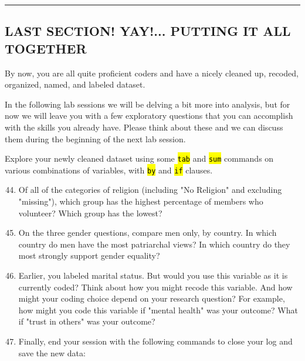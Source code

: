 \documentclass{tufte-handout}
\begin{document}
\bigskip
\hrule
\bigskip

\subsection{LAST SECTION! YAY!... PUTTING IT ALL TOGETHER}

By now, you are all quite proficient coders and have a nicely cleaned up, recoded, organized, named, and labeled dataset.

In the following lab sessions we will be delving a bit more into analysis, but for now we will leave you with a few exploratory questions that you can accomplish with the skills you already have. Please think about these and we can discuss them during the beginning of the next lab session.

Explore your newly cleaned dataset using some {\tt \hl{tab}} and {\tt \hl{sum}} commands on various combinations of variables, with {\tt \hl{by}} and {\tt \hl{if}} clauses.

\begin{enumerate}[leftmargin=.5in]
\setcounter{enumi}{43}
	\item Of all of the categories of religion (including "No Religion" and excluding "missing"), which group has the highest percentage of members who volunteer? Which group has the lowest?
	\item On the three gender questions, compare men only, by country. In which country do men have the most patriarchal views? In which country do they most strongly support gender equality?
	\item Earlier, you labeled marital status. But would you use this variable as it is currently coded?  Think about how you might recode this variable.  And how might your coding choice depend on your research question?  For example, how might you code this variable if "mental health" was your outcome?  What if "trust in others" was your outcome?
	\item Finally, end your session with the following commands to close your log and save the new data: \\
\medskip
{}\\
	\end{enumerate}
\end{document}
